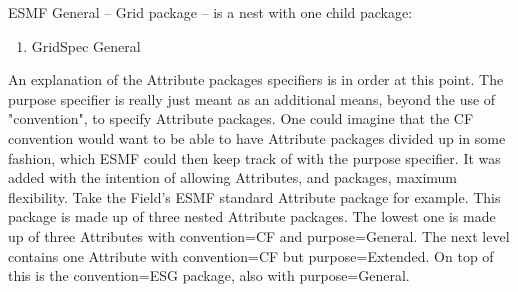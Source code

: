 ESMF General -- Grid package -- is a nest with one child package:
\begin{enumerate}
   \item GridSpec General
\end{enumerate}

An explanation of the Attribute packages specifiers is in order at this point.  The purpose specifier is really just meant as an additional means, beyond the use of "convention", to specify Attribute packages.  One could imagine that the CF convention would want to be able to have Attribute packages divided up in some fashion, which ESMF could then keep track of with the purpose specifier.  It was added with the intention of allowing Attributes, and packages, maximum flexibility.  Take the Field's ESMF standard Attribute package for example.  This package is made up of three nested Attribute packages.  The lowest one is made up of three Attributes with convention=CF and purpose=General.  The next level contains one Attribute with convention=CF but purpose=Extended.  On top of this is the convention=ESG package, also with purpose=General.
